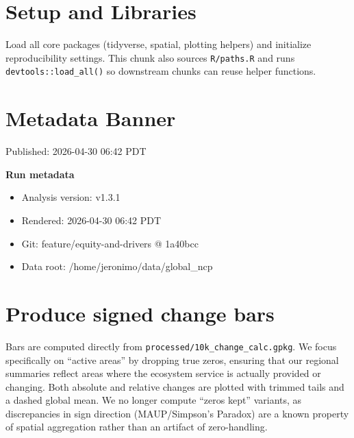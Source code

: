 \documentclass[
  letterpaper,
  DIV=11,
  numbers=noendperiod]{scrartcl}
\providecommand{\tightlist}{%
  \setlength{\itemsep}{0pt}\setlength{\parskip}{0pt}}
\begin{document}
\section{Setup and Libraries}\label{setup-and-libraries}

Load all core packages (tidyverse, spatial, plotting helpers) and
initialize reproducibility settings. This chunk also sources
\texttt{R/paths.R} and runs \texttt{devtools::load\_all()} so downstream
chunks can reuse helper functions.

\section{Metadata Banner}\label{metadata-banner}

Published: 2026-04-30 06:42 PDT

\begin{tcolorbox}[enhanced jigsaw, colframe=quarto-callout-note-color-frame, colback=white, leftrule=.75mm, left=2mm, bottomrule=.15mm, arc=.35mm, toprule=.15mm, coltitle=black, rightrule=.15mm, opacityback=0, breakable, toptitle=1mm, opacitybacktitle=0.6, bottomtitle=1mm, colbacktitle=quarto-callout-note-color!10!white, title=\textcolor{quarto-callout-note-color}{\faInfo}\hspace{0.5em}{Note}, titlerule=0mm]

\textbf{Run metadata}

\begin{itemize}
\tightlist
\item
  Analysis version: v1.3.1
\item
  Rendered: 2026-04-30 06:42 PDT
\item
  Git: feature/equity-and-drivers @ 1a40bcc
\item
  Data root: /home/jeronimo/data/global\_ncp
\end{itemize}

\end{tcolorbox}

\section{Produce signed change bars}\label{produce-signed-change-bars}

Bars are computed directly from
\texttt{processed/10k\_change\_calc.gpkg}. We focus specifically on
``active areas'' by dropping true zeros, ensuring that our regional
summaries reflect areas where the ecosystem service is actually provided
or changing. Both absolute and relative changes are plotted with trimmed
tails and a dashed global mean. We no longer compute ``zeros kept''
variants, as discrepancies in sign direction (MAUP/Simpson's Paradox)
are a known property of spatial aggregation rather than an artifact of
zero-handling.
\end{document}
